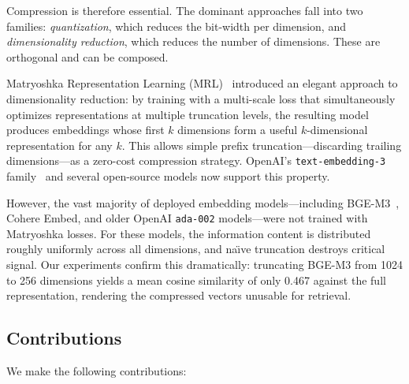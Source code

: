 \documentclass[journal]{IEEEtran}
\begin{document}
Compression is therefore essential.
The dominant approaches fall into two families: \emph{quantization}, which reduces the bit-width per dimension, and \emph{dimensionality reduction}, which reduces the number of dimensions.
These are orthogonal and can be composed.

Matryoshka Representation Learning (MRL)~\cite{kusupati2022matryoshka} introduced an elegant approach to dimensionality reduction: by training with a multi-scale loss that simultaneously optimizes representations at multiple truncation levels, the resulting model produces embeddings whose first $k$ dimensions form a useful $k$-dimensional representation for any $k$.
This allows simple prefix truncation---discarding trailing dimensions---as a zero-cost compression strategy.
OpenAI's \texttt{text-embedding-3} family~\cite{openai2024embeddings} and several open-source models now support this property.

However, the vast majority of deployed embedding models---including BGE-M3~\cite{xiao2024bge}, Cohere Embed, and older OpenAI \texttt{ada-002} models---were not trained with Matryoshka losses.
For these models, the information content is distributed roughly uniformly across all dimensions, and na\"{\i}ve truncation destroys critical signal.
Our experiments confirm this dramatically: truncating BGE-M3 from 1024 to 256 dimensions yields a mean cosine similarity of only 0.467 against the full representation, rendering the compressed vectors unusable for retrieval.

\subsection{Contributions}

We make the following contributions:
\end{document}
